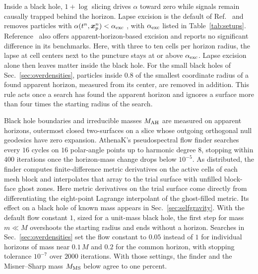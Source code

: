 Inside a black hole, $1+\log$ slicing drives $\alpha$ toward zero while signals remain causally trapped behind the horizon. Lapse excision is the default of Ref.~\cite{Wu:2026nrpic} and removes particles with $\alpha(t^n, \bm{x}_p^n) < \alpha_{\rm exc}$ \cite{Rosswog:2023nnl}, with $\alpha_{\rm exc}$ listed in Table~\ref{tab:setups}. Reference~\cite{Wu:2026nrpic} also offers apparent-horizon-based excision and reports no significant difference in its benchmarks. Here, with three to ten cells per horizon radius, the lapse at cell centers next to the puncture stays at or above $\alpha_{\rm exc}$. Lapse excision alone then leaves matter inside the black hole. For the small black holes of Sec.~\ref{sec:overdensities}, particles inside $0.8$ of the smallest coordinate radius of a found apparent horizon, measured from its center, are removed in addition. This rule acts once a search has found the apparent horizon and ignores a surface more than four times the starting radius of the search.

Black hole boundaries and irreducible masses $M_{\rm AH}$ are measured on apparent horizons, outermost closed two-surfaces on a slice whose outgoing orthogonal null geodesics have zero expansion. AthenaK's pseudospectral flow finder \cite{Gundlach:1997us,Zhu:2024utz} searches every $16$ cycles on $16$ polar-angle points up to harmonic degree $8$, stopping within $400$ iterations once the horizon-mass change drops below $10^{-5}$. As distributed, the finder computes finite-difference metric derivatives on the active cells of each mesh block and interpolates that array to the trial surface with unfilled block-face ghost zones. Here metric derivatives on the trial surface come directly from differentiating the eight-point Lagrange interpolant of the ghost-filled metric. Its effect on a black hole of known mass appears in Sec.~\ref{sec:selfgravity}. With the default flow constant $1$, sized for a unit-mass black hole, the first step for mass $m \ll M$ overshoots the starting radius and ends without a horizon. Searches in Sec.~\ref{sec:overdensities} set the flow constant to $0.05$ instead of $1$ for individual horizons of mass near $0.1\,M$ and $0.2$ for the common horizon, with stopping tolerance $10^{-7}$ over $2000$ iterations. With those settings, the finder and the Misner--Sharp mass $M_{\rm MS}$ below agree to one percent.

